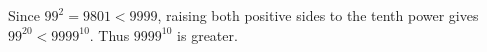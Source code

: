 Since $99^2=9801<9999$, raising both positive sides to the tenth power gives $99^{20}<9999^{10}$. Thus $\boxed{9999^{10}}$ is greater.
